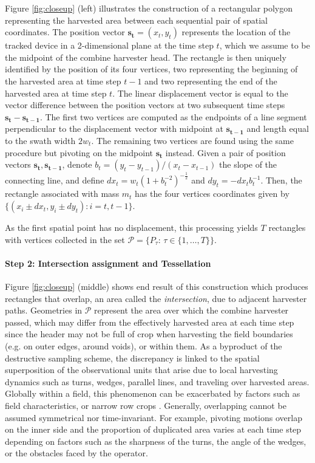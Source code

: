 Figure \ref{fig:closeup} (left) illustrates the construction of a
rectangular polygon representing the harvested area between each
sequential pair of spatial coordinates. The position vector
$\mathbf{s_t} = (x_{t}, y_{t})$ represents the location of the tracked
device in a 2-dimensional plane at the time step $t$, which we assume
to be the midpoint of the combine harvester head. The rectangle is
then uniquely identified by the position of its four vertices, two
representing the beginning of the harvested area at time step $t-1$
and two representing the end of the harvested area at time step
$t$. The linear displacement vector is equal to the vector difference
between the position vectors at two subsequent time steps
$\mathbf{s_t} - \mathbf{s_{t-1}}$. The first two vertices are computed
as the endpoints of a line segment perpendicular to the displacement
vector with midpoint at $\mathbf{s_{t-1}}$ and length equal to the
swath width $2 w_t$. The remaining two vertices are found using the
same procedure but pivoting on the midpoint $\mathbf{s_t}$
instead. Given a pair of position vectors
$\mathbf{s_t}, \mathbf{s_{t-1}}$, denote
$b_t = (y_t - y_{t-1}) / (x_t - x_{t-1})$ the slope of the connecting
line, and define $dx_t = w_t (1 + b_t^{-2})^{-\frac{1}{2}}$ and
$dy_t = - dx_t b_t^{-1}$. Then, the rectangle associated with mass
$m_t$ has the four vertices coordinates given by
$\{(x_{i} \pm dx_t, y_{i} \pm dy_t): i = t, t-1\}$.

As the first spatial point has no displacement, this processing yields
$T$ rectangles with vertices collected in the set
$\mathcal{P} = \{P_{\tau}$: $\tau \in \{1, \dots, T\}\}$.

\paragraph{Step 2: Intersection assignment and Tessellation}

 Figure \ref{fig:closeup} (middle) shows
end result of this construction which produces rectangles that
overlap, an area called the \emph{intersection}, due to adjacent
harvester paths. Geometries in $\mathcal{P}$ represent the area over
which the combine harvester passed, which may differ from the
effectively harvested area at each time step since the header may not
be full of crop when harvesting the field boundaries (e.g. on outer
edges, around voids), or within them. As a byproduct of the
destructive sampling scheme, the discrepancy is linked to the spatial
superposition of the observational units that arise due to local
harvesting dynamics such as turns, wedges, parallel lines, and
traveling over harvested areas. Globally within a field, this
phenomenon can be exacerbated by factors such as field
characteristics, or narrow row crops \cite{Ross2008}. Generally,
overlapping cannot be assumed symmetrical nor time-invariant. For
example, pivoting motions overlap on the inner side and the proportion
of duplicated area varies at each time step depending on factors such
as the sharpness of the turns, the angle of the wedges, or the
obstacles faced by the operator.

